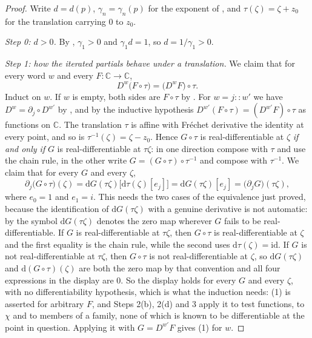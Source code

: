 \begin{proof}
Write $d=d(p)$, $\gamma_n=\gamma_n(p)$ for the exponent of ,
and $\tau(\zeta)=\zeta+z_0$ for the translation carrying $0$ to $z_0$.

\emph{Step 0: $d>0$.}  By , $\gamma_1>0$ and
$\gamma_1d=1$, so $d=1/\gamma_1>0$.

\emph{Step 1: how the iterated partials behave under a translation.}  We claim
that for every word $w$ and every $F\colon\mathbb{C}\to\mathbb{C}$,
\begin{equation}\tag{1}
  D^{w}\bigl(F\circ\tau\bigr)=\bigl(D^{w}F\bigr)\circ\tau .
\end{equation}
Induct on $w$.  If $w$ is empty, both sides are $F\circ\tau$ by
.  For $w=j\!:\!\!:w'$ we have
$D^{w}=\partial_j\circ D^{w'}$ by , and by the inductive
hypothesis $D^{w'}(F\circ\tau)=(D^{w'}F)\circ\tau$ as functions on
$\mathbb{C}$.  The translation $\tau$ is affine with Fréchet derivative the
identity at every point, and so is $\tau^{-1}(\zeta)=\zeta-z_0$.  Hence
$G\circ\tau$ is real-differentiable at $\zeta$ \emph{if and only if} $G$ is
real-differentiable at $\tau\zeta$: in one direction compose with $\tau$ and use
the chain rule, in the other write $G=(G\circ\tau)\circ\tau^{-1}$ and compose
with $\tau^{-1}$.  We claim that for every $G$ and every $\zeta$,
\[
  \partial_j\bigl(G\circ\tau\bigr)(\zeta)
  =\mathrm{d}G(\tau\zeta)\bigl[\mathrm{d}\tau(\zeta)[e_j]\bigr]
  =\mathrm{d}G(\tau\zeta)[e_j]=\bigl(\partial_jG\bigr)(\tau\zeta),
\]
where $e_0=1$ and $e_1=i$.  This needs the two cases of the equivalence just
proved, because the identification of $\mathrm{d}G(\tau\zeta)$ with a genuine
derivative is not automatic: by  the symbol
$\mathrm{d}G(\tau\zeta)$ denotes the zero map wherever $G$ fails to be
real-differentiable.  If $G$ is real-differentiable at $\tau\zeta$, then
$G\circ\tau$ is real-differentiable at $\zeta$ and the first equality is the
chain rule, while the second uses $\mathrm{d}\tau(\zeta)=\mathrm{id}$.  If $G$
is not real-differentiable at $\tau\zeta$, then $G\circ\tau$ is not
real-differentiable at $\zeta$, so $\mathrm{d}G(\tau\zeta)$ and
$\mathrm{d}(G\circ\tau)(\zeta)$ are both the zero map by that convention and
all four expressions in the display are $0$.  So the display holds for every $G$
and every $\zeta$, with no differentiability hypothesis, which is what the
induction needs: (1) is asserted for arbitrary $F$, and Steps 2(b), 2(d) and 3
apply it to test functions, to $\chi$ and to members of a 
family, none of which is known to be differentiable at the point in question.
Applying it with $G=D^{w'}F$ gives (1) for $w$.


\end{proof}
